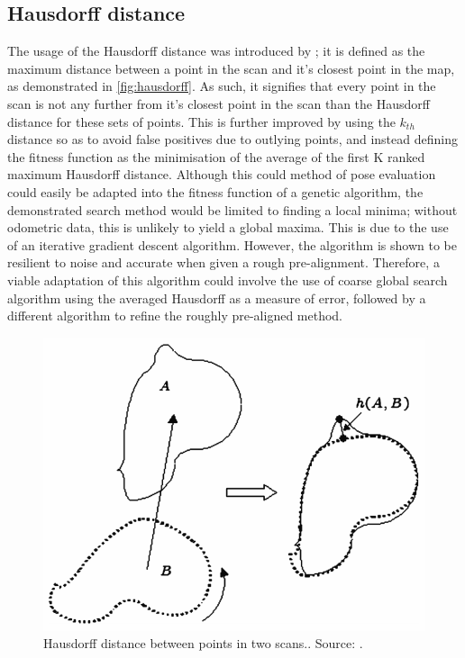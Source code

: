 \documentclass[authoryearcitations]{UoYCSproject}
\begin{document}
\subsection{Hausdorff distance}
The usage of the Hausdorff distance was introduced by \citet{Donoso-Aguirre2008-pb}; it is defined as the maximum distance between a point in the scan and it's closest point in the map, as demonstrated in \autoref{fig:hausdorff}. As such, it signifies that every point in the scan is not any further from it's closest point in the scan than the Hausdorff distance for these sets of points. This is further improved by using the $k_{th}$ distance so as to avoid false positives due to outlying points, and instead defining the fitness function as the minimisation of the average of the first K ranked maximum Hausdorff distance. Although this could method of pose evaluation could easily be adapted into the fitness function of a genetic algorithm, the demonstrated search method would be limited to finding a local minima; without odometric data, this is unlikely to yield a global maxima. This is due to the use of an iterative gradient descent algorithm. However, the algorithm is shown to be resilient to noise and accurate when given a rough pre-alignment. Therefore, a viable adaptation of this algorithm could involve the use of coarse global search algorithm using the averaged Hausdorff as a measure of error, followed by a different algorithm to refine the roughly pre-aligned method.

\begin{figure}[t]
	\centering
	\includegraphics[width=\textwidth,keepaspectratio]{images/hausdorff.png}

	\caption{Hausdorff distance between points in two scans.. Source: \citet{Donoso-Aguirre2008-pb}.}
	\label{fig:hausdorff}
\end{figure}
\end{document}
